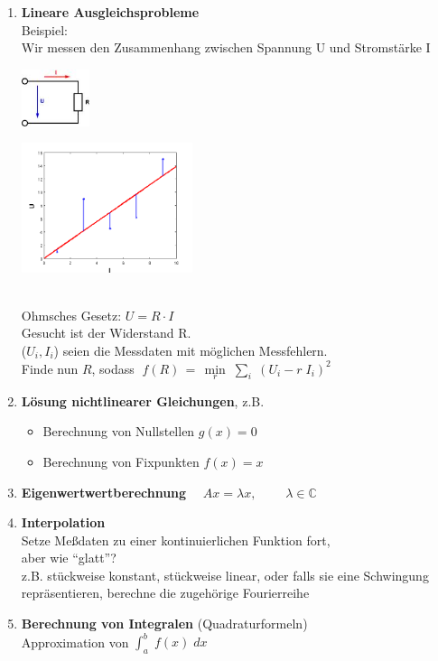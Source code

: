 \documentclass[ngerman,fontsize=11pt, paper=a4, parskip=half, titlepage=true, toc=bib]{scrbook}
\theoremstyle{definition}
\theoremstyle{plain}
\begin{document}
\begin{enumerate}
\item \textbf{Lineare Ausgleichsprobleme}\\
  Beispiel:\\
  Wir messen den Zusammenhang zwischen Spannung U und
  Stromstärke I\\
  \parbox[c]{3cm}{\includegraphics[width=2cm]{images/ohmsche.jpeg} }
  \parbox[c]{6cm}{\includegraphics[width=5cm]{images/linausgl2.png}} \\
  Ohmsches Gesetz: $U = R \cdot I$\\
  Gesucht ist der Widerstand R. \\
  ($U_i, I_i$) seien die Messdaten mit möglichen Messfehlern.\\
  Finde nun $R$, sodass 
  $\; f(R)\, =\,  \min\limits_r \; \sum\limits_i \; (U_i - r \; I_i)^2$
  
\item \textbf{Lösung nichtlinearer Gleichungen},
  z.B.
  \begin{itemize}
  \item Berechnung von Nullstellen $g(x) = 0$
  \item Berechnung von Fixpunkten $f(x) = x$
  \end{itemize}  
\item \textbf{Eigenwertwertberechnung}
  $\quad Ax= \lambda x, \qquad \; \lambda \in \mathbb{C}$
  
  
\item \textbf{Interpolation}\\
  Setze Meßdaten zu einer kontinuierlichen Funktion fort, \\
  aber wie \enquote{glatt}?\\
  z.B. stückweise konstant, stückweise linear, oder 
  falls sie
  eine Schwingung repräsentieren, berechne die zugehörige
  Fourierreihe  
  
\item \textbf{Berechnung von Integralen} (Quadraturformeln) \\ 
  Approximation von $\int_a^b \; f(x) \; dx$
\end{enumerate}~\\
\end{document}
